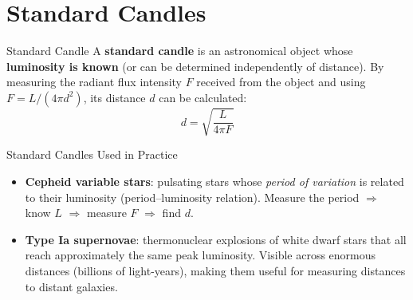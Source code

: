 \vspace{0.3em}
\begin{center}
\end{center}

\section{Standard Candles}

\begin{definitionbox}{Standard Candle}
A \textbf{standard candle} is an astronomical object whose \textbf{luminosity is known} (or can be determined independently of distance). By measuring the radiant flux intensity $F$ received from the object and using $F = L/(4\pi d^2)$, its distance $d$ can be calculated:
$$d = \sqrt{\frac{L}{4\pi F}}$$
\end{definitionbox}

\begin{keybox}{Standard Candles Used in Practice}
\begin{itemize}[itemsep=3pt]
  \item \textbf{Cepheid variable stars}: pulsating stars whose \emph{period of variation} is related to their luminosity (period--luminosity relation). Measure the period $\Rightarrow$ know $L$ $\Rightarrow$ measure $F$ $\Rightarrow$ find $d$.
  \item \textbf{Type Ia supernovae}: thermonuclear explosions of white dwarf stars that all reach approximately the same peak luminosity. Visible across enormous distances (billions of light-years), making them useful for measuring distances to distant galaxies.
\end{itemize}
\end{keybox}

